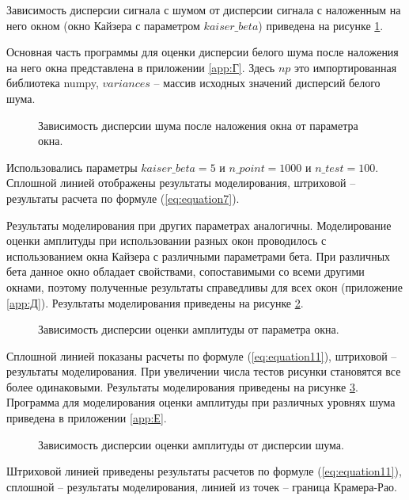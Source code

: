 Зависимость дисперсии сигнала с шумом от дисперсии сигнала с наложенным на него окном (окно Кайзера с параметром $kaiser\_beta$) приведена на рисунке \ref{img:noise_win_var}.

Основная часть программы для оценки дисперсии белого шума после наложения на него окна представлена в приложении \ref{app:Г}. Здесь $np$ это импортированная библиотека numpy, $variances$ -- массив исходных значений дисперсий белого шума.
\begin{figure}[ht]
	\caption{Зависимость дисперсии шума после наложения окна от параметра окна.}\label{img:noise_win_var}
\end{figure}
Использовались параметры $kaiser\_beta=5$ и $n\_point = 1000$ и $n\_test = 100$.
Сплошной линией отображены результаты моделирования, штриховой -- результаты расчета по формуле (\ref{eq:equation7}).

Результаты моделирования при других параметрах аналогичны. Моделирование оценки амплитуды при использовании разных окон проводилось с использованием окна Кайзера с различными параметрами бета. При различных бета данное окно обладает свойствами, сопоставимыми со всеми другими окнами, поэтому полученные результаты справедливы для всех окон (приложение \ref{app:Д}). 
Результаты моделирования приведены на рисунке \ref{img:estimate_amp_sin_kaiser_beta}. 
\begin{figure}[ht]
	\caption{Зависимость дисперсии оценки амплитуды от параметра окна.}\label{img:estimate_amp_sin_kaiser_beta}
\end{figure}

Сплошной линией показаны расчеты по формуле (\ref{eq:equation11}), штриховой -- результаты моделирования. При увеличении числа тестов рисунки становятся все более одинаковыми. Результаты моделирования приведены на рисунке \ref{img:estimate_amp_sin_kaiser_noise}. Программа для моделирования оценки амплитуды при различных уровнях шума приведена в приложении \ref{app:Е}.
\begin{figure}[ht]
	\caption{Зависимость дисперсии оценки амплитуды от дисперсии шума.}\label{img:estimate_amp_sin_kaiser_noise}
\end{figure}

Штриховой линией приведены результаты расчетов по формуле (\ref{eq:equation11}), сплошной -- результаты моделирования, линией из точек -- граница Крамера-Рао.

